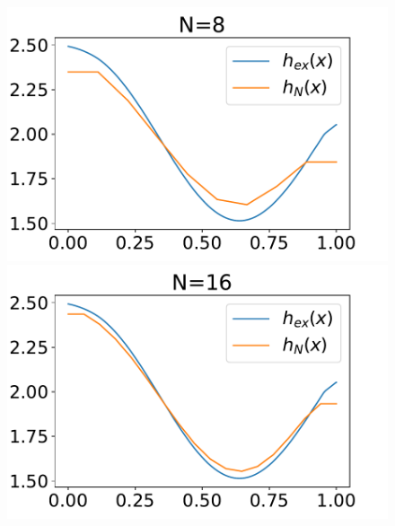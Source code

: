 \documentclass[
11pt, %
francais, %
singlespacing, %
headsepline, %
f%
]{MastersDoctoralThesis} %
\theoremstyle{definition}
\begin{document}
\begin{figure}
\includegraphics[scale = .6]{testconv8}
\includegraphics[scale = .6]{testconv16} 
\end{figure}
\end{document}
